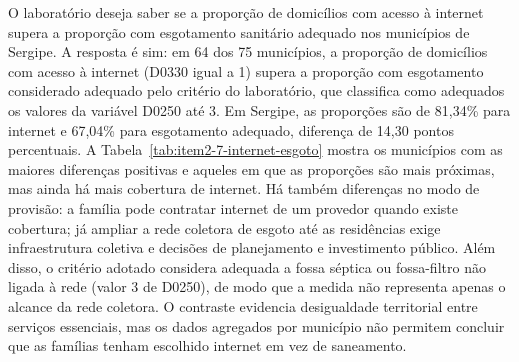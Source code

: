 O laboratório deseja saber se a proporção de domicílios com acesso à internet supera a proporção com esgotamento sanitário adequado nos municípios de Sergipe. A resposta é sim: em 64 dos 75 municípios, a proporção de domicílios com acesso à internet (D0330 igual a 1) supera a proporção com esgotamento considerado adequado pelo critério do laboratório, que classifica como adequados os valores da variável D0250 até 3. Em Sergipe, as proporções são de 81,34\% para internet e 67,04\% para esgotamento adequado, diferença de 14,30 pontos percentuais. A Tabela~\ref{tab:item2-7-internet-esgoto} mostra os municípios com as maiores diferenças positivas e aqueles em que as proporções são mais próximas, mas ainda há mais cobertura de internet. Há também diferenças no modo de provisão: a família pode contratar internet de um provedor quando existe cobertura; já ampliar a rede coletora de esgoto até as residências exige infraestrutura coletiva e decisões de planejamento e investimento público. Além disso, o critério adotado considera adequada a fossa séptica ou fossa-filtro não ligada à rede (valor 3 de D0250), de modo que a medida não representa apenas o alcance da rede coletora. O contraste evidencia desigualdade territorial entre serviços essenciais, mas os dados agregados por município não permitem concluir que as famílias tenham escolhido internet em vez de saneamento.
